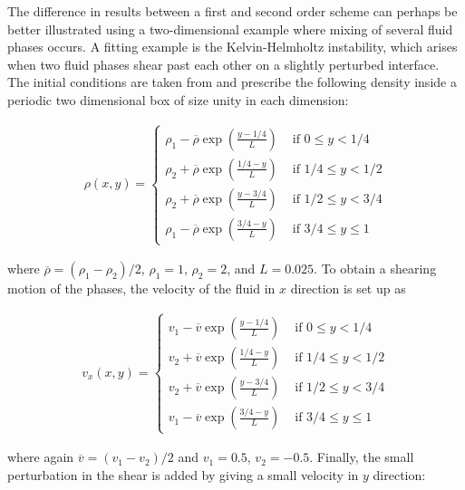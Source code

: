The difference in results between a first and second order scheme can perhaps be better illustrated
using a two-dimensional example where mixing of several fluid phases occurs. A fitting example is
the Kelvin-Helmholtz instability, which arises when two fluid phases shear past each other on a
slightly perturbed interface. The initial conditions are taken from
\citet{mcnallyWellposedKelvinHelmholtzInstability2012} and prescribe the following density inside a
periodic two dimensional box of size unity in each dimension:

\begin{align}
\rho(x,y) = \begin{cases}
            \rho_1 - \overline{\rho} \exp \left( \frac{y - 1/4}{L} \right) &
                \text{ if } 0 \leq y < 1/4 \\
            \rho_2 + \overline{\rho} \exp \left( \frac{1/4 - y}{L} \right) &
                \text{ if } 1/4  \leq y < 1/2 \\
            \rho_2 + \overline{\rho} \exp \left( \frac{y - 3/4}{L} \right) &
                \text{ if } 1/2  \leq y < 3/4 \\
            \rho_1 - \overline{\rho} \exp \left( \frac{3/4 - y}{L} \right) &
                \text{ if } 3/4 \leq y \leq 1
            \end{cases}
\end{align}

where $\overline{\rho} = (\rho_1 - \rho_2) / 2$, $\rho_1 = 1$, $\rho_2 = 2$, and $L = 0.025$. To
obtain a shearing motion of the phases, the velocity of the fluid in $x$ direction is set up as

\begin{align}
v_x(x,y) = \begin{cases}
            v_1 - \overline{v} \exp \left( \frac{y - 1/4}{L} \right) &
                \text{ if } 0 \leq y < 1/4 \\
            v_2 + \overline{v} \exp \left( \frac{1/4 - y}{L} \right) &
                \text{ if } 1/4  \leq y < 1/2 \\
            v_2 + \overline{v} \exp \left( \frac{y - 3/4}{L} \right) &
                \text{ if } 1/2  \leq y < 3/4 \\
            v_1 - \overline{v} \exp \left( \frac{3/4 - y}{L} \right) &
                \text{ if } 3/4 \leq y \leq 1
            \end{cases}
\end{align}

where again $\overline{v} = (v_1 - v_2) / 2$ and $v_1 = 0.5$, $v_2 = -0.5$. Finally, the small
perturbation in the shear is added by giving a small velocity in $y$ direction:

